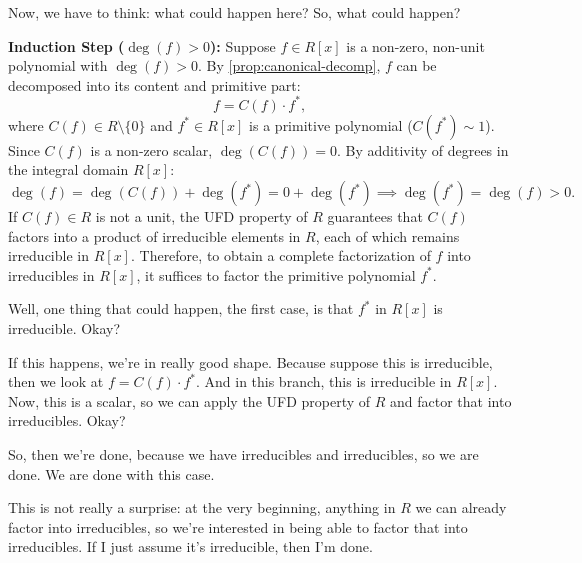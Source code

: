 \begin{proofWrapper}
\begin{speech}[00:23:58 - 00:25:57]
Now, we have to think: what could happen here? So, what could happen? 
\end{speech}

\begin{content}
\textbf{Induction Step ($\deg(f) > 0$):}
Suppose $f \in R[x]$ is a non-zero, non-unit polynomial with $\deg(f) > 0$.
By \cref{prop:canonical-decomp}, $f$ can be decomposed into its content and primitive part:
\[
f = C(f) \cdot f^*,
\]
where $C(f) \in R \setminus \{0\}$ and $f^* \in R[x]$ is a primitive polynomial ($C(f^*) \sim 1$).
Since $C(f)$ is a non-zero scalar, $\deg(C(f)) = 0$. By additivity of degrees in the integral domain $R[x]$:
\[
\deg(f) = \deg(C(f)) + \deg(f^*) = 0 + \deg(f^*) \implies \deg(f^*) = \deg(f) > 0.
\]
If $C(f) \in R$ is not a unit, the UFD property of $R$ guarantees that $C(f)$ factors into a product of irreducible elements in $R$, each of which remains irreducible in $R[x]$. Therefore, to obtain a complete factorization of $f$ into irreducibles in $R[x]$, it suffices to factor the primitive polynomial $f^*$.
\end{content}

\begin{speech}[00:25:57 - 00:27:36]
Well, one thing that could happen, the first case, is that $f^*$ in $R[x]$ is irreducible.  Okay?

If this happens, we're in really good shape. Because suppose this is irreducible, then we look at $f = C(f) \cdot f^*$.  And in this branch, this is irreducible in $R[x]$.  Now, this is a scalar, so we can apply the UFD property of $R$ and factor that into irreducibles.  Okay?

So, then we're done, because we have irreducibles and irreducibles, so we are done. We are done with this case. 

This is not really a surprise: at the very beginning, anything in $R$ we can already factor into irreducibles, so we're interested in being able to factor that into irreducibles. If I just assume it's irreducible, then I'm done.
\end{speech}


\end{proofWrapper}
